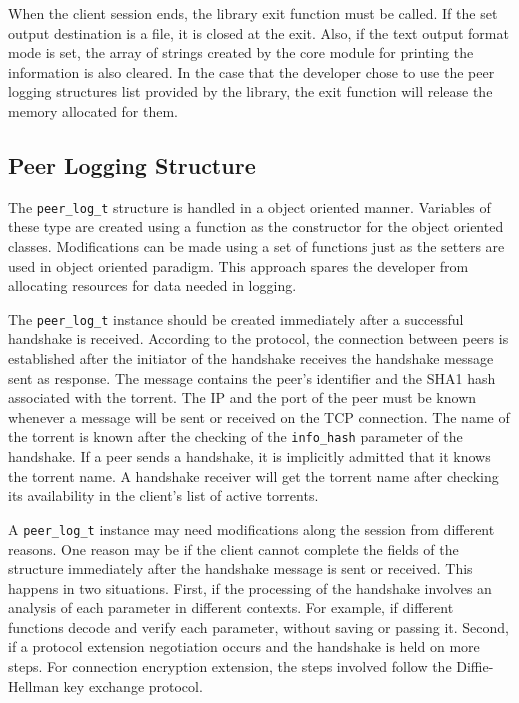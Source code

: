 When the client session ends, the library exit function must be called. If the
set output destination is a file, it is closed at the exit. Also, if the text
output format mode is set, the array of strings created by the core module for
printing the information is also cleared. In the case that the developer chose
to use the peer logging structures list provided by the library, the exit
function will release the memory allocated for them.

\subsection{Peer Logging Structure}

The \texttt{peer\_log\_t} structure is handled in a object oriented manner.
Variables of these type are created using a function as the constructor for
the object oriented classes. Modifications can be made using a set of
functions just as the setters are used in object oriented paradigm. This
approach spares the developer from allocating resources for data needed in
logging.

The \texttt{peer\_log\_t} instance should be created immediately after a
successful handshake is received. According to the protocol, the connection
between peers is established after the initiator of the handshake receives the
handshake message sent as response. The message contains the peer's identifier
and the SHA1 hash associated with the torrent. The IP and the port of the peer
must be known whenever a message will be sent or received on the TCP
connection. The name of the torrent  is known after the checking of the
\texttt{info\_hash} parameter of the handshake. If a peer sends a handshake,
it is implicitly admitted that it knows the torrent name. A handshake receiver
will get the torrent name after checking its availability in the client's list
of active torrents.

A \texttt{peer\_log\_t} instance may need modifications along the session from
different reasons. One reason may be if the client cannot complete the fields
of the structure immediately after the handshake message is sent or received.
This happens in two situations. First, if the processing of the handshake
involves an analysis of each parameter in different contexts. For example, if
different functions decode and verify each parameter, without saving or
passing it.  Second, if a protocol extension negotiation occurs and the
handshake is held on more steps. For connection encryption extension, the
steps involved follow the Diffie-Hellman key exchange protocol.

